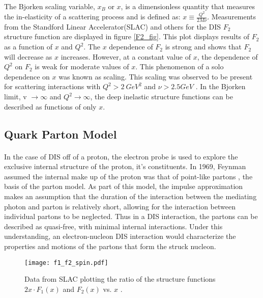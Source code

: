 \paragraph{}The Bjorken scaling variable, $x_B$ or $x$, is a dimensionless quantity that measures the in-elasticity of a scattering process and is defined as: $x \equiv \frac{Q^2}{2M\nu}$. Measurements from the Standford Linear Accelerator(SLAC) and others for the DIS $F_2$ structure function are displayed in figure \ref{F2_fig}. This plot displays results of $F_2$ as a function of $x$ and $Q^2$. The $x$ dependence of $F_2$ is strong and shows that $F_2$ will decrease as $x$ increases. However, at a constant value of $x$, the dependence of $Q^2$ on $F_2$ is weak for moderate values of $x$. This phenomenon of a solo dependence on $x$ was known as scaling. This scaling was observed to be present for scattering interactions with $Q^2 > 2 \: GeV^2$  and $\nu > 2.5 GeV$ \cite{Atwood}. In the Bjorken limit, v $\rightarrow \infty$ and $Q^2 \rightarrow \infty$, the deep inelastic structure functions can be described as functions of only $x$.


\subsection{Quark Parton Model}
\paragraph{}In the case of DIS off of a proton, the electron probe is used to explore the exclusive internal structure of the proton, it's constituents. In 1969, Feynman assumed the internal make up of the proton was that of point-like partons \cite{Briskin_thesis,DISproton}, the basis of the parton model. As part of this model, the impulse approximation makes an assumption that the duration of the interaction between the mediating photon and parton is relatively short, allowing for the interaction between individual partons to be neglected. Thus in a DIS interaction, the partons can be described as quasi-free, with minimal internal interactions. Under this understanding, an electron-nucleon DIS interaction would characterize the properties and motions of the partons that form the struck nucleon\cite{DISproton}.

\begin{figure}[t]
	\centering
	\texttt{[image: f1\_f2\_spin.pdf]} 
	\caption{Data from SLAC plotting the ratio of the structure functions $2x\cdot F_1(x)$ and $F_2(x)$ vs. $x$ \cite{PnN,IntroHEP}.}
	\label{fig:spin1/2}
\end{figure} 

